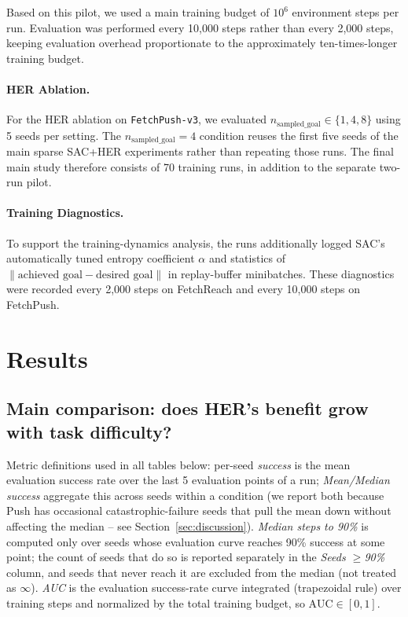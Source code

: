 \documentclass{article}
\begin{document}
Based on this pilot, we used a main training budget of $10^6$ environment
steps per run. Evaluation was performed every 10,000 steps rather than every
2,000 steps, keeping evaluation overhead proportionate to the approximately
ten-times-longer training budget.

\paragraph{HER Ablation.}
For the HER ablation on \texttt{FetchPush-v3}, we evaluated
$n_{\text{sampled\_goal}} \in \{1,4,8\}$ using 5 seeds per setting.
The $n_{\text{sampled\_goal}}=4$ condition reuses the first five seeds of the
main sparse SAC+HER experiments rather than repeating those runs. The final
main study therefore consists of 70 training runs, in addition to the separate
two-run pilot.

\paragraph{Training Diagnostics.}
To support the training-dynamics analysis, the runs additionally logged SAC's
automatically tuned entropy coefficient $\alpha$ and statistics of
$\lVert \text{achieved goal} - \text{desired goal} \rVert$ in replay-buffer
minibatches. These diagnostics were recorded every 2,000 steps on FetchReach
and every 10,000 steps on FetchPush.

\section{Results}
\label{sec:results}

\subsection{Main comparison: does HER's benefit grow with task difficulty?}

Metric definitions used in all tables below: per-seed \emph{success} is the
mean evaluation success rate over the last 5 evaluation points of a run;
\emph{Mean/Median success} aggregate this across seeds within a condition
(we report both because Push has occasional catastrophic-failure seeds that
pull the mean down without affecting the median -- see
Section~\ref{sec:discussion}). \emph{Median steps to 90\%} is computed only
over seeds whose evaluation
curve reaches 90\% success at some point; the count of seeds that do so is
reported separately in the \emph{Seeds $\geq$90\%} column, and seeds that
never reach it are excluded from the median (not treated as $\infty$).
\emph{AUC} is the evaluation success-rate curve integrated (trapezoidal
rule) over training steps and normalized by the total training budget, so
$\mathrm{AUC}\in[0,1]$.
\end{document}
